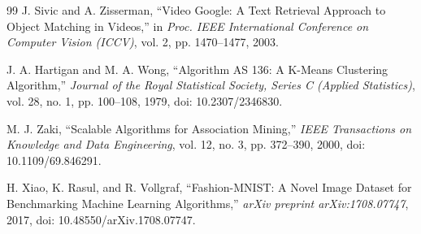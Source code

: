 \begin{thebibliography}{99}
J. Sivic and A. Zisserman,
``Video Google: A Text Retrieval Approach to Object Matching in Videos,''
in \textit{Proc. IEEE International Conference on Computer Vision (ICCV)},
vol. 2, pp. 1470--1477, 2003.

J. A. Hartigan and M. A. Wong,
``Algorithm AS 136: A K-Means Clustering Algorithm,''
\textit{Journal of the Royal Statistical Society,
Series C (Applied Statistics)},
vol. 28, no. 1, pp. 100--108, 1979,
doi: 10.2307/2346830.

M. J. Zaki,
``Scalable Algorithms for Association Mining,''
\textit{IEEE Transactions on Knowledge and Data Engineering},
vol. 12, no. 3, pp. 372--390, 2000,
doi: 10.1109/69.846291.


H. Xiao, K. Rasul, and R. Vollgraf,
``Fashion-MNIST: A Novel Image Dataset for Benchmarking
Machine Learning Algorithms,''
\textit{arXiv preprint arXiv:1708.07747}, 2017,
doi: 10.48550/arXiv.1708.07747.


\end{thebibliography}
